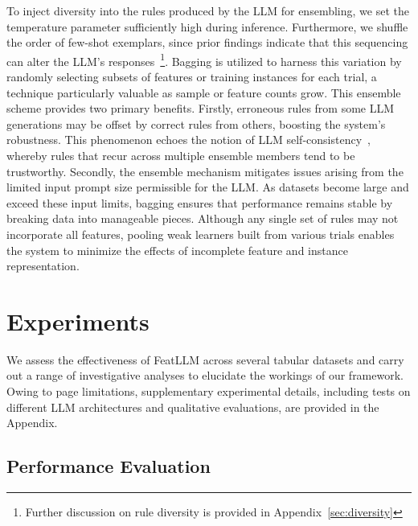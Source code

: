 To inject diversity into the rules produced by the LLM for ensembling, we set the temperature parameter sufficiently high during inference. Furthermore, we shuffle the order of few-shot exemplars, since prior findings indicate that this sequencing can alter the LLM's responses~\cite{lu2022fantastically}\footnote{Further discussion on rule diversity is provided in Appendix~\ref{sec:diversity}}. Bagging is utilized to harness this variation by randomly selecting subsets of features or training instances for each trial, a technique particularly valuable as sample or feature counts grow. This ensemble scheme provides two primary benefits. Firstly, erroneous rules from some LLM generations may be offset by correct rules from others, boosting the system's robustness. This phenomenon echoes the notion of LLM self-consistency~\cite{wang2022self}, whereby rules that recur across multiple ensemble members tend to be trustworthy. Secondly, the ensemble mechanism mitigates issues arising from the limited input prompt size permissible for the LLM. As datasets become large and exceed these input limits, bagging ensures that performance remains stable by breaking data into manageable pieces. Although any single set of rules may not incorporate all features, pooling weak learners built from various trials enables the system to minimize the effects of incomplete feature and instance representation.

\section{Experiments}
We assess the effectiveness of \textsf{FeatLLM} across several tabular datasets and carry out a range of investigative analyses to elucidate the workings of our framework. Owing to page limitations, supplementary experimental details, including tests on different LLM architectures and qualitative evaluations, are provided in the Appendix.

\subsection{Performance Evaluation}
